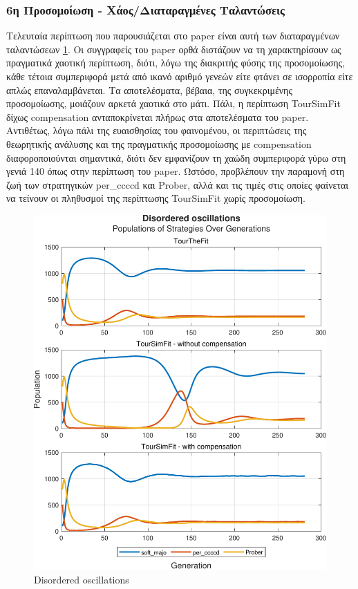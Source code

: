 \documentclass[12pt]{article}
\begin{document}
\subsubsection{6η Προσομοίωση - Χάος/Διαταραγμένες Ταλαντώσεις}
Τελευταία περίπτωση που παρουσιάζεται στο paper είναι αυτή των διαταραγμένων ταλαντώσεων \ref{fig:Χάος/Διαταραγμένες Ταλαντώσεις}. Οι συγγραφείς του paper ορθά διστάζουν να τη χαρακτηρίσουν ως πραγματικά χαοτική περίπτωση, διότι, λόγω της διακριτής φύσης της προσομοίωσης, κάθε τέτοια συμπεριφορά μετά από ικανό αριθμό γενεών είτε φτάνει σε ισορροπία είτε απλώς επαναλαμβάνεται. Τα αποτελέσματα, βέβαια, της συγκεκριμένης προσομοίωσης, μοιάζουν αρκετά χαοτικά στο μάτι. Πάλι, η περίπτωση TourSimFit δίχως compensation ανταποκρίνεται πλήρως στα αποτελέσματα του paper. Αντιθέτως, λόγω πάλι της ευαισθησίας του φαινομένου, οι περιπτώσεις της θεωρητικής ανάλυσης και της πραγματικής προσομοίωσης με compensation διαφοροποιούνται σημαντικά, διότι δεν εμφανίζουν τη χαώδη συμπεριφορά γύρω στη γενιά 140 όπως στην περίπτωση του paper. Ωστόσο, προβλέπουν την παραμονή στη ζωή των στρατηγικών per\_ccccd και Prober, αλλά και τις τιμές στις οποίες φαίνεται να τείνουν οι πληθυσμοί της περίπτωσης TourSimFit χωρίς προσομοίωση.
	\begin{figure}[h]
	      \centering
	      \includegraphics[scale=0.8]{Disordered oscillations.pdf}
	      \caption{Disordered oscillations}
	      \label{fig:Χάος/Διαταραγμένες Ταλαντώσεις}
	\end{figure}
\end{document}
